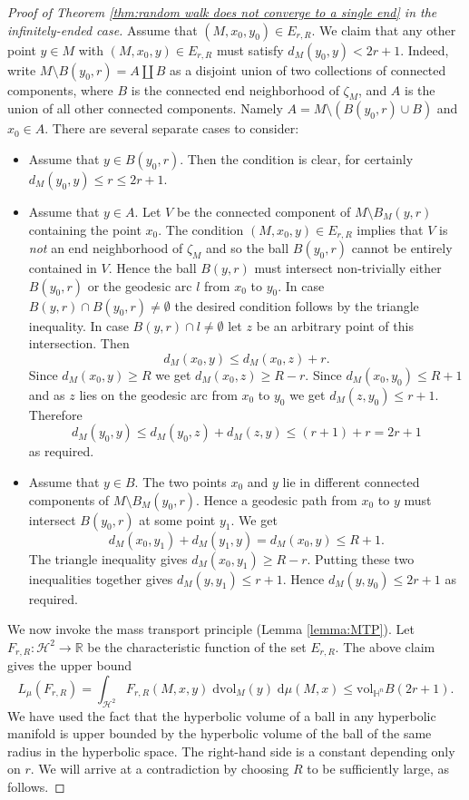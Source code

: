 \documentclass[10pt,a4paper]{amsart}
\newcommand{\HH}{\mathbb{H}}
\newcommand{\Hypers}{\mathcal{H}}
\begin{document}
\begin{proof}[Proof of Theorem \ref{thm:random walk does not converge to a single end} in the infinitely-ended case]
Assume that $(M,x_0,y_0) \in E_{r,R}$. We claim that any other point $y \in M$ with $(M,x_0,y) \in E_{r,R}$ must satisfy $d_M(y_0,y) < 2r+1$. Indeed, write $M \setminus B(y_0,r) = A \amalg B$ as a disjoint union of two collections of connected components, where $B$ is the connected end neighborhood of $\zeta_M$, and $A$ is the union of all other connected components. Namely  $A = M \setminus (B(y_0,r) \cup B)$ and $x_0 \in A$. There are several separate cases to consider:
\begin{itemize}
    \item Assume that $y \in B(y_0,r)$. Then the condition is clear, for certainly $d_M(y_0,y) \le r \le 2r+1$.
        \item Assume that $y \in A$. Let $V$ be the connected component of $M \setminus B_M(y,r)$ containing the point $x_0$. The condition $(M,x_0,y) \in E_{r,R}$ implies that $V$ is \emph{not} an end neighborhood of $\zeta_M$ and so the ball $B(y_0,r)$ cannot be entirely contained in $V$. Hence the ball $B(y,r)$ must intersect non-trivially either $B(y_0,r)$ or the geodesic arc $l$ from $x_0$ to $y_0$. In case $B(y,r) \cap B(y_0,r) \neq \emptyset$ the desired condition follows by the triangle inequality. In case $B(y,r) \cap l \neq \emptyset$ let $z$ be an arbitrary point of this intersection. Then $$d_M(x_0,y) \le d_M(x_0,z) + r.$$ 
    Since $d_M(x_0,y) \ge R$  we get $d_M(x_0,z) \ge R-r$. Since $d_M(x_0,y_0) \le R+1$ and as  $z$ lies on the geodesic arc from $x_0$ to $y_0$ we get $d_M(z,y_0) \le r+1$.  Therefore
    $$d_M(y_0,y) \le d_M(y_0,z) + d_M(z,y) \le (r+1)+r = 2r + 1$$
    as required.

    \item Assume that $y \in B$. The two points $x_0$ and $y$ lie in different connected components of $M \setminus B_M(y_0,r)$. Hence a geodesic path from $x_0$ to $y$ must intersect $B(y_0,r)$ at some point $y_1$.  We get
    $$ d_M(x_0,y_1) + d_M(y_1,y) = d_M(x_0,y) \le   R+ 1.$$ 
    The triangle inequality gives $d_M(x_0,y_1) \ge R-r$. Putting these two inequalities together gives $d_M(y,y_1) \le r+1$. Hence $d_M(y,y_0) \le 2r+1$ as required.

\end{itemize}

We now invoke the mass transport principle (Lemma \ref{lemma:MTP}). 
Let $F_{r,R} : \Hypers^2 \to \mathbb{R}$ be the characteristic function of the set $E_{r,R}$. 
The above claim gives the upper bound
$$ L_\mu (F_{r,R}) = \int_{\Hypers^2} F_{r,R}(M,x,y) \; \mathrm{dvol}_M(y) \; \mathrm{d}\mu(M,x) \le \mathrm{vol}_{\HH^n} B(2r+1).$$
We have used the fact that the hyperbolic volume of a ball in any hyperbolic manifold is upper bounded by the hyperbolic volume of the ball of the same radius in the hyperbolic space. The right-hand side is a constant depending only on $r$. 
We will arrive at a contradiction  by choosing $R$  to be sufficiently large, as follows. 


\end{proof}
\end{document}
